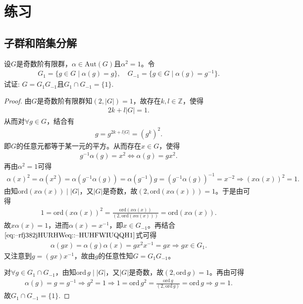 \documentclass[../../main.tex]{subfiles}%
\begin{document}
\section{练习}

\subsection{子群和陪集分解}

\begin{example}
设$G$是奇数阶有限群，$\alpha \in \mathrm{Aut}(G)$且$\alpha^2 = 1$。令
\begin{align*}
G_1 = \{g \in G \mid \alpha(g) = g\}, \quad
G_{-1} = \{g \in G \mid \alpha(g) = g^{-1}\}.
\end{align*}
试证: $G = G_1G_{-1}$且$G_1 \cap G_{-1} = \{1\}$.
\end{example}
\begin{proof}

由$G$是奇数阶有限群知$(2,|G|)=1$，故存在$k,l\in\mathbb{Z}$，使得
\begin{align*}
2k+l|G|=1.
\end{align*}
从而对$\forall g\in G$，结合有
\begin{align*}
g=g^{2k+l|G|}=(g^k)^2.
\end{align*}
即$G$的任意元都等于某一元的平方。从而存在$x\in G$，使得
\begin{align}
g^{-1}\alpha(g)=x^2\Longleftrightarrow \alpha(g)=gx^2.\label{eq:--rfj382jHURHWeq::--HUHFWIUQQH1}
\end{align}
再由$\alpha^2=1$可得
\begin{align*}
\alpha(x)^2=\alpha(x^2)=\alpha(g^{-1}\alpha(g))=\alpha(g^{-1})g=(g^{-1}\alpha(g))^{-1}=x^{-2}\Longrightarrow (x\alpha(x))^2=1.
\end{align*}
由知$\mathrm{ord}(x\alpha(x))\mid|G|$，又$|G|$是奇数，故$(2,\mathrm{ord}(x\alpha(x)))=1$。于是由可得
\begin{align*}
1=\mathrm{ord}(x\alpha(x))^2=\frac{\mathrm{ord}(x\alpha(x))}{(2,\mathrm{ord}(x\alpha(x)))}=\mathrm{ord}(x\alpha(x)).
\end{align*}
故$x\alpha(x)=1$，进而$\alpha(x)=x^{-1}$，即$x\in G_{-1}$。再结合$\eqref{eq:--rfj382jHURHWeq::--HUHFWIUQQH1}$式可得
\begin{align*}
\alpha(gx)=\alpha(g)\alpha(x)=gx^2x^{-1}=gx\Longrightarrow gx\in G_1.
\end{align*}
又注意到$g=(gx)x^{-1}$，故由$g$的任意性知$G=G_1G_{-1}$。

对$\forall g\in G_1\cap G_{-1}$，由知$\mathrm{ord}\,g\mid|G|$，又$|G|$是奇数，故$(2,\mathrm{ord}\,g)=1$。再由可得
\begin{align*}
\alpha(g)=g=g^{-1}\Longrightarrow g^2=1\Longrightarrow 1=\mathrm{ord}\,g^2=\frac{\mathrm{ord}\,g}{(2,\mathrm{ord}\,g)}=\mathrm{ord}\,g\Longrightarrow g=1.
\end{align*}
故$G_1\cap G_{-1}=\{1\}$.

\end{proof}
\end{document}
